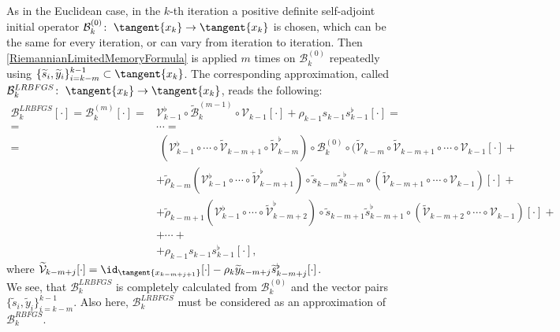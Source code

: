 As in the Euclidean case, in the $k$-th iteration a positive definite self-adjoint initial operator $\mathcal{B}^{(0)}_k \colon \; \tangent{x_k} \to \tangent{x_k}$ is chosen, which can be the same for every iteration, or can vary from iteration to iteration. Then \cref{RiemannianLimitedMemoryFormula} is applied $m$ times on $\mathcal{B}^{(0)}_k$ repeatedly using $\{ \widetilde{s}_i, \widetilde{y}_i\}_{i=k-m}^{k-1} \subset \tangent{x_k}$. The corresponding approximation, called $\mathcal{B}^{LRBFGS}_k \colon \; \tangent{x_k} \to \tangent{x_k}$, reads the following:
\begin{equation}\label{LRBFGSUpdate}
    \begin{split}
        \mathcal{B}^{LRBFGS}_k [\cdot] = \mathcal{B}^{(m)}_k [\cdot] = & \mathcal{V}^{\flat}_{k-1} \circ \widetilde{\mathcal{B}}^{(m-1)}_k \circ \mathcal{V}_{k-1} [\cdot] + \rho_{k-1} s_{k-1} s_{k-1}^{\flat} [\cdot] = \\
        = & \cdots = \\
        = & \; (\mathcal{V}^{\flat}_{k-1} \circ \cdots \circ \widetilde{\mathcal{V}}_{k-m+1} \circ \widetilde{\mathcal{V}}^{\flat}_{k-m}) \circ \mathcal{B}^{(0)}_k \circ (\widetilde{\mathcal{V}}_{k-m} \circ \widetilde{\mathcal{V}}_{k-m+1} \circ \cdots \circ \mathcal{V}_{k-1} [\cdot] + \\
        & + \widetilde{\rho}_{k-m} (\mathcal{V}^{\flat}_{k-1} \circ \cdots \circ \widetilde{\mathcal{V}}^{\flat}_{k-m+1}) \circ \widetilde{s}_{k-m} \widetilde{s}^{\flat}_{k-m} \circ (\widetilde{\mathcal{V}}_{k-m+1} \circ \cdots \circ \mathcal{V}_{k-1}) [\cdot] + \\
        & + \widetilde{\rho}_{k-m+1} (\mathcal{V}^{\flat}_{k-1} \circ \cdots \circ \widetilde{\mathcal{V}}^{\flat}_{k-m+2}) \circ \widetilde{s}_{k-m+1} \widetilde{s}^{\flat}_{k-m+1} \circ (\widetilde{\mathcal{V}}_{k-m+2} \circ \cdots \circ \mathcal{V}_{k-1}) [\cdot] + \\
        & + \cdots +\\
        & + \rho_{k-1} s_{k-1} s^{\flat}_{k-1} [\cdot],
    \end{split}
\end{equation}
where $\widetilde{\mathcal{V}}_{k-m+j} [\cdot] = \id_{\tangent{x_{k-m+j+1}}}[\cdot] - \rho_k \widetilde{y}_{k-m+j} \widetilde{s}_{k-m+j}^{\flat} [\cdot]$. \\
We see, that $\mathcal{B}^{LRBFGS}_k$ is completely calculated from $\mathcal{B}^{(0)}_k$ and the vector pairs $\{ \widetilde{s}_i, \widetilde{y}_i\}_{i=k-m}^{k-1}$. Also here, $\mathcal{B}^{LRBFGS}_k$ must be considered as an approximation of $\mathcal{B}^{RBFGS}_k$. \\
